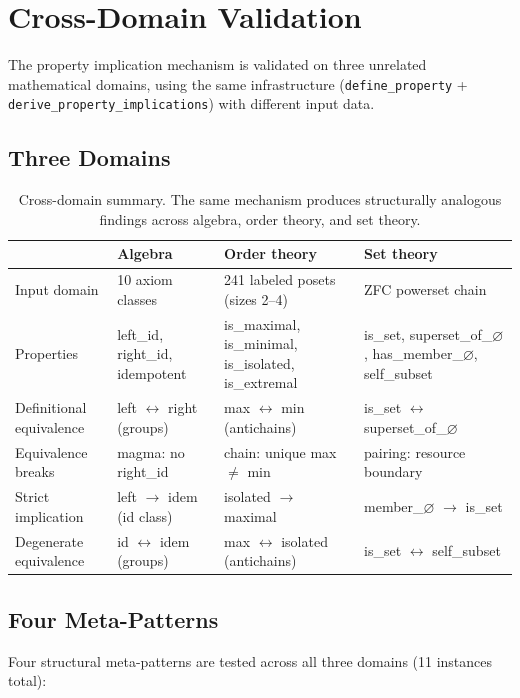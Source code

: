 \section{Cross-Domain Validation}
\label{sec:cross}

The property implication mechanism is validated on three unrelated mathematical domains, using the same infrastructure (\texttt{define\_property} + \texttt{derive\_property\_implications}) with different input data.

\subsection{Three Domains}

\begin{table}[h]
\centering
\caption{Cross-domain summary. The same mechanism produces structurally analogous findings across algebra, order theory, and set theory.}
\label{tab:cross-domain}
\begin{tabular}{p{3.2cm}p{3.5cm}p{3.5cm}p{3.5cm}}
\toprule
 & Algebra & Order theory & Set theory \\
\midrule
Input domain & 10 axiom classes & 241 labeled posets (sizes 2--4) & ZFC powerset chain \\
Properties & left\_id, right\_id, idempotent & is\_maximal, is\_minimal, is\_isolated, is\_extremal & is\_set, superset\_of\_$\varnothing$, has\_member\_$\varnothing$, self\_subset \\
Definitional equivalence & left $\leftrightarrow$ right (groups) & max $\leftrightarrow$ min (antichains) & is\_set $\leftrightarrow$ superset\_of\_$\varnothing$ \\
Equivalence breaks & magma: no right\_id & chain: unique max $\neq$ min & pairing: resource boundary \\
Strict implication & left $\to$ idem (id class) & isolated $\to$ maximal & member\_$\varnothing$ $\to$ is\_set \\
Degenerate equivalence & id $\leftrightarrow$ idem (groups) & max $\leftrightarrow$ isolated (antichains) & is\_set $\leftrightarrow$ self\_subset \\
\bottomrule
\end{tabular}
\end{table}

\subsection{Four Meta-Patterns}

Four structural meta-patterns are tested across all three domains (11 instances total):

